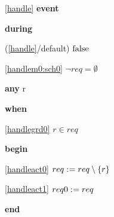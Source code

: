 \noindent \ref{handle}  \textbf{event}
\begin{block}
  \item   \textbf{during}
  \begin{block}
  \item[ (\ref{handle}/default) ]\sout{$\text{false}$} %
  \end{block}
  \begin{block}
  \item[ \eqref{handlem0:sch0} ]{$\neg req = \emptyset$} %
  \end{block}
  \item   \textbf{any} r
  \item   \textbf{when}
  \begin{block}
  \item[ \eqref{handlegrd0} ]{$r \in req$} %
  \end{block}
  \item   \textbf{begin}
  \begin{block}
  \item[ \eqref{handleact0} ]{$req \mathrel{:\mkern1mu=} req \setminus \{ r \}$} %
  \item[ \eqref{handleact1} ]{$req0 \mathrel{:\mkern1mu=} req$} %
  \end{block}
  \item   \textbf{end} \\
\end{block}
